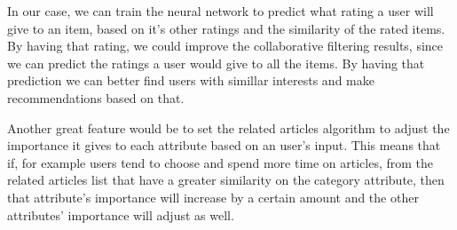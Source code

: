 In our case, we can train the neural network to predict what rating a user will give to an item, based on it's other ratings and the similarity of the rated items.
By having that rating, we could improve the collaborative filtering results, since we can predict the ratings a user would give to all the items. By having that prediction we can better find users with simillar interests and make recommendations based on that.

Another great feature would be to set the related articles algorithm to adjust the importance it gives to each attribute based on an user's input. This means that if, for example users tend to choose and spend more time on articles, from the related articles list that have a greater similarity on the category attribute, then that attribute's importance will increase by a certain amount and the other attributes' importance will adjust as well.